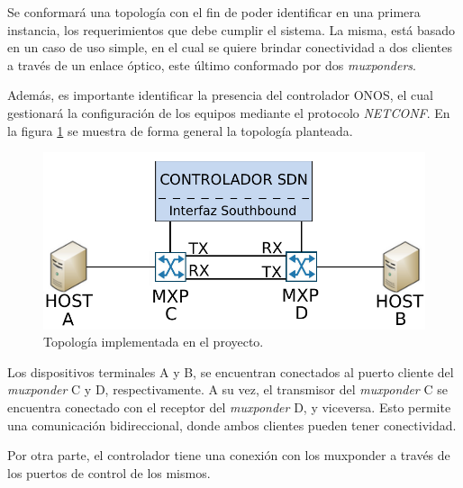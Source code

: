 Se conformará una topología con el fin de poder identificar en una primera instancia, los requerimientos que debe cumplir el sistema. La misma, está basado en un caso de uso simple, en el cual se quiere brindar conectividad a dos clientes a través de un enlace óptico, este último conformado por dos \textit{muxponders}.  

Además, es importante identificar la presencia del controlador ONOS, el cual gestionará la configuración de los equipos mediante el protocolo \textit{NETCONF}. En la figura \ref{fig:topologia} se muestra de forma general la topología planteada.

\begin{figure}[H]
    \centering
    \includegraphics[scale=0.85]{Figures/topologia.pdf}
    \caption{Topología implementada en el proyecto.}
    \label{fig:topologia}
  \end{figure}


Los dispositivos terminales A y B, se encuentran conectados al puerto cliente del \textit{muxponder} C y D, respectivamente. A su vez, el transmisor del \textit{muxponder} C se encuentra conectado con el receptor del \textit{muxponder} D, y viceversa. Esto permite una comunicación bidireccional, donde ambos clientes pueden tener conectividad. 

Por otra parte, el controlador tiene una conexión con los muxponder a través de los puertos de control de los mismos.

